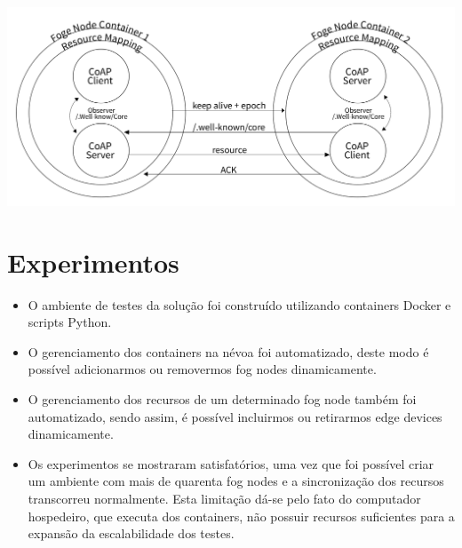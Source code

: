\documentclass[a0,portrait]{lab-poster}
\begin{document}
\begin{multicols}{2}
\begin{itemize}
\end{itemize}

\begin{center}
    \includegraphics[width=0.7\linewidth]{fig/fig3.png}
\end{center}

\section*{\huge Experimentos}

\Large
\justifying
\begin{itemize}

\item O ambiente de testes da solução foi construído utilizando containers Docker e scripts Python.
\item O gerenciamento dos containers na névoa foi automatizado, deste modo é possível adicionarmos ou removermos fog nodes dinamicamente.
\item O gerenciamento dos recursos de um determinado fog node também foi automatizado, sendo assim, é possível incluirmos ou retirarmos edge devices dinamicamente.
\item Os experimentos se mostraram satisfatórios, uma vez que foi possível criar um ambiente com mais de quarenta fog nodes e a sincronização dos recursos transcorreu normalmente.
Esta limitação dá-se pelo fato do computador hospedeiro, que executa dos containers, não possuir recursos suficientes para a expansão da escalabilidade dos testes.



\end{itemize}
\vspace{-10mm}
\large
\color{NavyBlue}
\color{Black}
\raggedright



\end{multicols}

\end{document}
